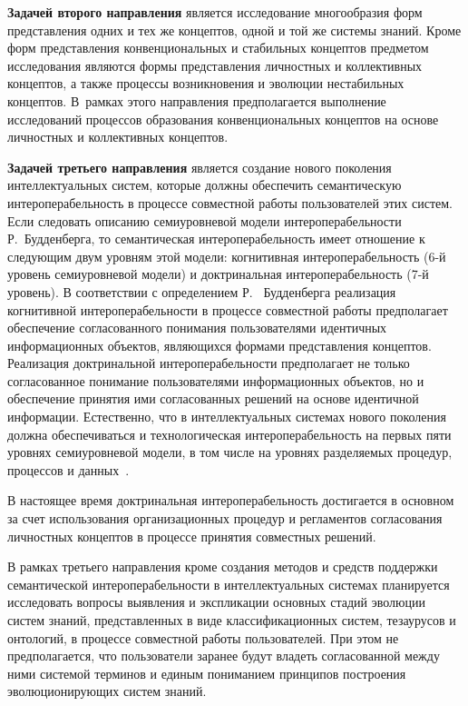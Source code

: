 \begin{multicols}{2}
   \textbf{Задачей второго направления} является исследование многообразия форм
представления одних и тех же концептов, одной и той же системы знаний. Кроме форм
представления конвенциональных и стабильных концептов предметом исследования
являются формы представления личностных и коллективных концептов, а также процессы
возникновения и эволюции нестабильных концептов. В~рамках этого направления
предполагается выполнение исследований процессов образования конвенциональных
концептов на основе личностных и коллективных концептов.

   \textbf{Задачей третьего направления} является создание нового поколения
интеллектуальных систем, которые должны обеспечить семантическую интероперабельность
в процессе совместной работы пользователей этих систем. Если следовать описанию
семиуровневой модели интероперабельности Р.~Будденберга, то семантическая
интероперабельность имеет отношение к следующим двум уровням этой модели:
когнитивная интероперабельность (\mbox{6-й} уровень семиуровневой модели) и доктринальная
интероперабельность (7-й уровень). В соответствии с определением Р.~ Будденберга
реализация когнитивной интероперабельности в процессе совместной работы предполагает
обеспечение согласованного понимания пользователями идентичных информационных
объектов, являющихся формами представления концептов. Реализация доктринальной
интероперабельности предполагает не только согласованное понимание пользователями
информационных объектов, но и обеспечение принятия ими согласованных решений на
основе идентичной информации. Естественно, что в интеллектуальных системах нового
поколения должна обеспечиваться и технологическая интероперабельность на первых пяти
уровнях семиуровневой модели, в том чис\-ле на уровнях разделяемых процедур, процессов и
данных~\cite{18za, 19za}.

   В настоящее время доктринальная интероперабельность достигается в основном за счет
использования организационных процедур и регламентов согласования личностных
концептов в процессе принятия совместных решений.

   В рамках третьего направления кроме создания методов и средств поддержки
семантической интероперабельности в интеллектуальных сис\-те\-мах планируется исследовать
вопросы выявления и экспликации основных стадий эволюции систем знаний,
представленных в виде классификационных систем, тезаурусов и онтологий, в процессе
совместной работы пользователей. При этом не предполагается, что пользователи заранее
будут владеть согласованной между ними системой терминов и единым пониманием
принципов построения эволюционирующих систем знаний.


\end{multicols}
